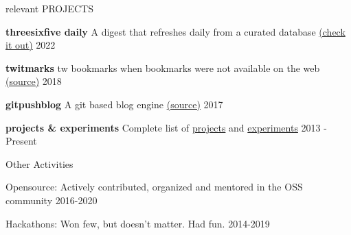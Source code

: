 \documentclass{resume} %
\begin{document}

\begin{rSection}{relevant PROJECTS}
  \vspace{-1.25em}
  \item \textbf{threesixfive daily} {A digest that refreshes daily from a curated database \href{https://daily.threesixfive.shop/}{(check it out)}
  } \hfill 2022
  \item \textbf{twitmarks} {tw bookmarks when bookmarks were not available on the web \href{https://github.com/geekodour/twitmarks}{(source)}
  } \hfill 2018
  \item \textbf{gitpushblog} {A git based blog engine \href{https://github.com/geekodour/gitpushblog}{(source)}} \hfill 2017
  \item \textbf{projects \& experiments} {Complete list of \href{https://geekodour.org/docs/updates/projects/}{projects} and
 \href{https://geekodour.org/docs/updates/experiments/}{experiments}
  } \hfill 2013 - Present
\end{rSection}

\begin{rSection}{Other Activities}
  \vspace{-1.25em}
    \item Opensource: Actively contributed, organized and mentored in the OSS community \hfill 2016-2020
    \item Hackathons: Won few, but doesn't matter. Had fun. \hfill 2014-2019
\end{rSection}




\end{document}

